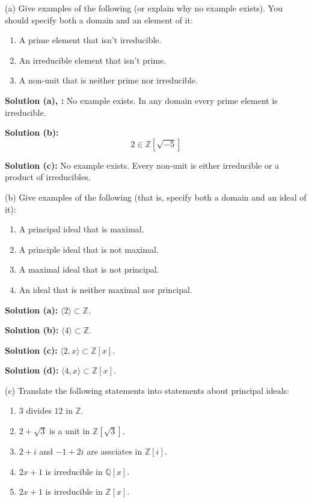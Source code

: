 \begin{problem}[Warmup]{(a)}
    Give examples of the following (or explain why no example exists).
    You should specify both a domain and an element of it:
    \begin{enumerate}
        \item A prime element that isn't irreducible.
        \item An irreducible element that isn't prime.
        \item A non-unit that is neither prime nor irreducible.
    \end{enumerate}
\end{problem}
\solved

\textbf{Solution (a), :} 
No example exists. In any domain every prime element is irreducible.

\textbf{Solution (b):}
\[2 \in \mathbb{Z}[\sqrt{-5}]\]

\textbf{Solution (c):}
No example exists. Every non-unit is either irreducible or a product of irreducibles.

\begin{problem}[Warmup]{(b)}
    Give examples of the following (that is,
    specify both a domain and an ideal of it):
    \begin{enumerate}
        \item A principal ideal that is maximal.
        \item A principle ideal that is not maximal.
        \item A maximal ideal that is not principal.
        \item An ideal that is neither maximal nor principal.
    \end{enumerate}
\end{problem}
\solved

\textbf{Solution (a):} $\langle 2 \rangle \subset \mathbb{Z}$.

\textbf{Solution (b):} $\langle 4 \rangle \subset \mathbb{Z}$.

\textbf{Solution (c):} $\langle 2, x \rangle \subset \mathbb{Z}[x]$.

\textbf{Solution (d):} $\langle 4, x \rangle \subset \mathbb{Z}[x]$.

\newpage

\begin{problem}[Warmup]{(c)}
    Translate the following statements into statements about principal ideals:
    \begin{enumerate}
        \item $3$ divides $12$ in $\mathbb{Z}$.
        \item $2 + \sqrt{3}$ is a unit in $\mathbb{Z}[\sqrt{3}]$.
        \item $2 + i$ and $-1 + 2i$ are assciates in $\mathbb{Z}[i]$.
        \item $2x + 1$ is irreducible in $\mathbb{Q}[x]$.
        \item $2x + 1$ is irreducible in $\mathbb{Z}[x]$.
    \end{enumerate}
\end{problem}
\solved


